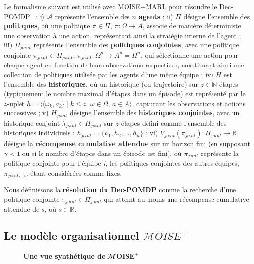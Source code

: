 \documentclass[final]{jfsma}
\begin{document}
Le formalisme suivant est utilisé avec MOISE+MARL pour résoudre le Dec-POMDP~\cite{Beynier2013,Albrecht2024} :
%
i) \(\mathcal{A}\) représente l'ensemble des \(n\) \textbf{agents}
; \quad
ii) \(\Pi\) désigne l'ensemble des \textbf{politiques}, où une politique \(\pi \in \Pi\), \(\pi: \Omega \rightarrow A\), associe de manière déterministe une observation à une action, représentant ainsi la stratégie interne de l'agent
; \quad
iii) \(\Pi_{joint}\) représente l'ensemble des \textbf{politiques conjointes}, avec une politique conjointe \(\pi_{joint} \in \Pi_{joint}\), \(\pi_{joint}: \Omega^n \rightarrow A^n = \Pi^n\), qui sélectionne une action pour chaque agent en fonction de leurs observations respectives, constituant ainsi une collection de politiques utilisée par les agents d'une même équipe
; \quad
iv) \(H\) est l'ensemble des \textbf{historiques}, où un historique (ou trajectoire) sur \(z \in \mathbb{N}\) étapes (typiquement le nombre maximal d'étapes dans un épisode) est représenté par le \(z\)-uplet $h = \langle \langle \omega_{k}, a_{k}\rangle \mid k \leq z,\, \omega \in \Omega,\, a \in A\rangle$, capturant les observations et actions successives
; \quad
v) \(H_{joint}\) désigne l'ensemble des \textbf{historiques conjointes}, avec un historique conjoint \(h_{joint} \in H_{joint}\) sur \(z\) étapes défini comme l'ensemble des historiques individuels : $h_{joint} = \{h_1, h_2, \dots, h_n\}$
; \quad
vi) \(V_{joint}(\pi_{joint}) : \Pi_{joint} \rightarrow \mathbb{R}\) désigne la \textbf{récompense cumulative attendue} sur un horizon fini (en supposant \(\gamma < 1\) ou si le nombre d'étapes dans un épisode est fini), où \(\pi_{joint}\) représente la politique conjointe pour l'équipe \(i\), les politiques conjointes des autres équipes, \(\pi_{joint,-i}\), étant considérées comme fixes.

Nous définissons la \textbf{résolution du Dec-POMDP} comme la recherche d'une politique conjointe \(\pi_{joint} \in \Pi_{joint}\) qui atteint au moins une récompense cumulative attendue de \(s\), où \(s \in \mathbb{R}\).

\subsection{Le modèle organisationnel \(\mathcal{M}OISE^+\)}

\begin{figure}[h!]
  
  \caption{\textbf{Une vue synthétique de} $\mathbfcal{M}\mathbf{OISE^+}$}
  \label{fig:moise_model}
\end{figure}
\end{document}
